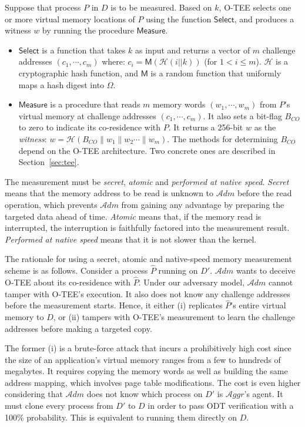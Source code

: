 \documentclass[letterpaper,twocolumn,10pt]{article}
\newcommand{\T}{\ensuremath{\mathcal{A}ggr}\xspace}
\newcommand{\ADM}{\ensuremath{\mathcal{A}dm}\xspace}
\newcommand{\dn}{\ensuremath{D}\xspace}
\newcommand{\da}{\ensuremath{D'}\xspace}
\begin{document}
Suppose that process $P$ in \dn is to be measured. Based on $k$, O-TEE selects one or more virtual memory locations
of $P$ using the function $\mathsf{Select}$, and produces a witness $w$ by running the procedure $\mathsf{Measure}$.
%
\begin{itemize}[leftmargin=*]
    \item $\mathsf{Select}$ is a function that takes $k$ as input and returns a vector of $m$
    challenge addresses $(c_1,\cdots,c_{m})$ where: $c_i=\mathsf{M}(\mathcal{H}(i||k))$ (for $1<i\leq m$).
    $\mathcal{H}$ is a cryptographic hash function, and $\mathsf{M}$ is a random function
    that uniformly maps a hash digest into $\Omega$.
    \item $\mathsf{Measure}$ is a procedure that reads $m$ memory words $(w_1,\cdots,w_{m})$ from $P$'s
    virtual memory at challenge addresses $(c_1,\cdots,c_{m})$. It also sets a bit-flag $B_{CO}$
    to zero to indicate its co-residence with $P$. It returns a 256-bit $w$ as the \emph{witness}:
    $w=\mathcal{H}(B_{CO}\|w_1\|w_2\cdots\|w_m)$.
    The methods for determining $B_{CO}$ depend on the O-TEE architecture. Two concrete ones are described in Section~\ref{sec:tee}.
 \end{itemize}
%
The measurement must be \emph{secret}, \emph{atomic} and {\em performed at native speed}. {\em Secret} means that the
memory address to be read is unknown to \ADM before the read operation, which prevents \ADM from gaining any
advantage by preparing the targeted data ahead of time. {\em Atomic} means that, if the memory read is interrupted, the
interruption is faithfully factored into the measurement result. {\em Performed at native speed} means that it is not
slower than the kernel.

The rationale for using a secret, atomic and native-speed memory measurement scheme is as follows.
Consider a process $\hat{P}$ running on \da. \ADM wants to deceive O-TEE about its co-residence with
$\hat{P}$. Under our adversary model, \ADM cannot tamper with O-TEE's execution. It also does not know any
challenge addresses before the measurement starts. Hence, it either (i) replicates $\hat{P}$'s entire virtual memory
to \dn, or (ii) tampers with O-TEE's measurement to learn the challenge addresses before making a targeted copy.

The former (i) is a brute-force attack that incurs a prohibitively high cost since the size of an application's
virtual memory ranges from a few to hundreds of megabytes. It requires copying the memory words
as well as building the same address mapping, which involves page table modifications.
The cost is even higher considering that \ADM does not know which process on \da is \T's agent.
It must clone every process from \da to \dn in order to pass ODT verification
with a 100\% probability. This is equivalent to running them directly on \dn.
\end{document}

